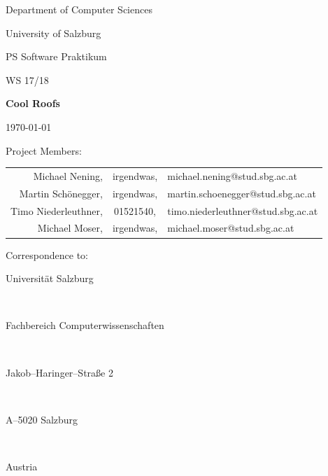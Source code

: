 \documentclass[12pt,a4paper]{article}
\begin{document}
\begin{titlepage}%
\vspace{2cm}
\centerline{
\large{Department of Computer Sciences}}
\vspace{0.2cm}
\centerline{\large{University of Salzburg}}%
\vspace{2cm}

\centerline{\large{PS Software Praktikum}}
\centerline{WS 17/18}
\vspace{1cm}

\centerline{\Large{\bf{Cool Roofs}} }%
\vspace{1cm}

\vspace{0.4cm}%
\centerline{\today}
\vspace{5cm}%

\vspace{0.2cm}
Project Members:
\begin{center}
  \begin{tabular}{rcl}
    Michael Nening,  & irgendwas,  & michael.nening@stud.sbg.ac.at \\
    Martin Schönegger,     & irgendwas,  & martin.schoenegger@stud.sbg.ac.at \\
    Timo Niederleuthner,& 01521540,  & timo.niederleuthner@stud.sbg.ac.at \\
    Michael Moser,    & irgendwas,  & michael.moser@stud.sbg.ac.at \\
  \end{tabular}
\end{center}
\vspace {1cm}


Correspondence to: \\
\centerline{Universit\"{a}t Salzburg} \\
\centerline{Fachbereich Computerwissenschaften} \\
\centerline{Jakob--Haringer--Stra\ss e 2} \\
\centerline{A--5020 Salzburg} \\
\centerline{Austria}
\clearpage
\end{titlepage}


\clearpage



\end{document}

